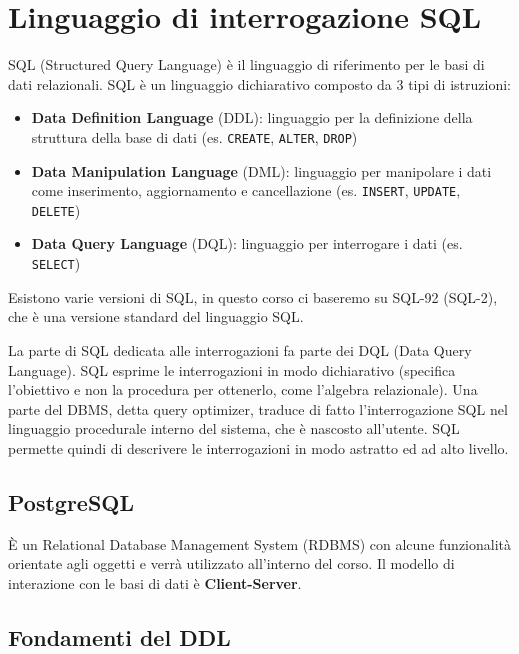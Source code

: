 \documentclass[a4paper]{article}
\begin{document}
\section{Linguaggio di interrogazione SQL}
SQL (Structured Query Language) è il linguaggio di riferimento per le basi di dati
relazionali. SQL è un linguaggio dichiarativo composto da 3 tipi di istruzioni:
\begin{itemize}
\item \textbf{Data Definition Language} (DDL): linguaggio per la definizione della
  struttura della base di dati (es. \texttt{CREATE}, \texttt{ALTER}, \texttt{DROP})

\item \textbf{Data Manipulation Language} (DML): linguaggio per manipolare i dati
  come inserimento, aggiornamento e cancellazione (es. \texttt{INSERT}, \texttt{UPDATE},
  \texttt{DELETE})

\item \textbf{Data Query Language} (DQL): linguaggio per interrogare i dati (es.
  \texttt{SELECT})
\end{itemize}
Esistono varie versioni di SQL, in questo corso ci baseremo su SQL-92 (SQL-2), che è una versione
standard del linguaggio SQL.

\vspace{1em}
\noindent
La parte di SQL dedicata alle interrogazioni fa parte dei DQL (Data Query Language). SQL esprime le
interrogazioni in modo dichiarativo (specifica l’obiettivo e non la procedura per ottenerlo,
come l’algebra relazionale). Una parte del DBMS, detta query optimizer, traduce di
fatto l’interrogazione SQL nel linguaggio procedurale interno del sistema, che è nascosto
all’utente. SQL permette quindi di descrivere le interrogazioni in modo astratto ed ad
alto livello.

\subsection{PostgreSQL}
È un Relational Database Management System (RDBMS) con alcune funzionalità orientate
agli oggetti e verrà utilizzato all'interno del corso. Il modello di interazione con
le basi di dati è \textbf{Client-Server}.

\subsection{Fondamenti del DDL}
\end{document}
